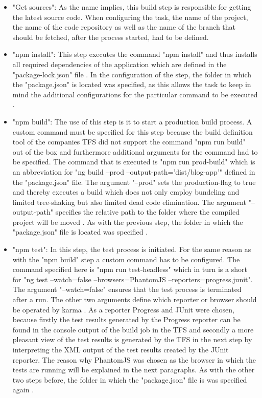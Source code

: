 \documentclass[Bachelor,BIF,english]{twbook}
\begin{document}
\begin{itemize}
\item "Get sources": As the name implies, this build step is responsible for getting the latest source code. When configuring the task, the name of the project, the name of the code repository as well as the name of the branch that should be fetched, after the process started, had to be defined.
\item "npm install": This step executes the command "npm install" and thus installs all required dependencies of the application which are defined in the "package-lock.json" file \cite{NpmInstall}. In the configuration of the step, the folder in which the "package.json" is located was specified, as this allows the task to keep in mind the additional configurations for the particular command to be executed \cite{NpmTaskInstall}.
\item "npm build": The use of this step is it to start a production build process. A custom command must be specified for this step because the build definition tool of the companies TFS did not support the command "npm run build" out of the box and furthermore additional arguments for the command had to be specified. The command that is executed is "npm run prod-build" which is an abbreviation for "ng build --prod --output-path='dist/blog-app'" defined in the "package.json" file. The argument "--prod" sets the production-flag to true and thereby executes a build which does not only employ bundeling and limited tree-shaking but also limited dead code elimination. The argument "--output-path" specifies the relative path to the folder where the compiled project will be moved \cite{AngularCliBuild}. As with the previous step, the folder in which the "package.json" file is located was specified \cite{NpmTaskCustom}.
\item "npm test": In this step, the test process is initiated. For the same reason as with the "npm build" step a custom command has to be configured. The command specified here is "npm run test-headless" which in turn is a short for "ng test --watch=false --browsers=PhantomJS --reporters=progress,junit". The argument "--watch=false" ensures that the test process is terminated after a run. The other two arguments define which reporter or browser should be operated by karma \cite{KarmaConfig}. As a reporter Progress and JUnit \cite{JUnit} \cite{KarmaJUnitReporter} were chosen, because firstly the test results generated by the Progress reporter can be found in the console output of the build job in the TFS and secondly a more pleasant view of the test results is generated by the TFS in the next step by interpreting the XML output of the test results created by the JUnit reporter. The reason why PhantomJS \cite{PhantomJS} was chosen as the browser in which the tests are running will be explained in the next paragraphs. As with the other two steps before, the folder in which the "package.json" file is was specified again \cite{NpmTaskCustom}.

\end{itemize}
\end{document}

